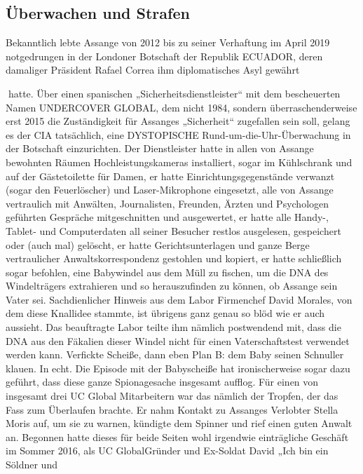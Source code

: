 \begin{multicols}{2}

\chapter{Überwachen und Strafen} 
Bekanntlich lebte Assange von 2012 bis zu seiner Verhaftung im April 2019 notgedrungen in der Londoner
Botschaft der Republik ECUADOR, deren damaliger Präsident Rafael Correa ihm diplomatisches Asyl gewährt

hatte. Über einen spanischen „Sicherheitsdienstleister“
mit dem bescheuerten Namen UNDERCOVER GLOBAL,
dem nicht 1984, sondern überraschenderweise erst 2015
die Zuständigkeit für Assanges „Sicherheit“ zugefallen
sein soll, gelang es der CIA tatsächlich, eine DYSTOPISCHE Rund-um-die-Uhr-Überwachung in der Botschaft
einzurichten. Der Dienstleister hatte in allen von Assange bewohnten Räumen Hochleistungskameras installiert, sogar im Kühlschrank und auf der Gästetoilette
für Damen, er hatte Einrichtungsgegenstände verwanzt
(sogar den Feuerlöscher) und Laser-Mikrophone eingesetzt, alle von Assange vertraulich mit Anwälten, Journalisten, Freunden, Ärzten und Psychologen geführten
Gespräche mitgeschnitten und ausgewertet, er hatte
alle Handy-, Tablet- und Computerdaten all seiner Besucher restlos ausgelesen, gespeichert oder (auch mal)
gelöscht, er hatte Gerichtsunterlagen und ganze Berge
vertraulicher Anwaltskorrespondenz gestohlen und kopiert, er hatte schließlich sogar befohlen, eine Babywindel aus dem Müll zu fischen, um die DNA des Windelträgers extrahieren und so herauszufinden zu können, ob
Assange sein Vater sei.
Sachdienlicher Hinweis aus dem Labor
Firmenchef David Morales, von dem diese Knallidee
stammte, ist übrigens ganz genau so blöd wie er auch aussieht. Das beauftragte Labor teilte ihm nämlich postwendend mit, dass die DNA aus den Fäkalien dieser Windel
nicht für einen Vaterschaftstest verwendet werden kann.
Verfickte Scheiße, dann eben Plan B: dem Baby seinen
Schnuller klauen. In echt. Die Episode mit der Babyscheiße hat ironischerweise sogar dazu geführt, dass diese ganze Spionagesache insgesamt aufflog. Für einen von insgesamt drei UC Global Mitarbeitern war das nämlich der
Tropfen, der das Fass zum Überlaufen brachte. Er nahm
Kontakt zu Assanges Verlobter Stella Moris auf, um sie zu
warnen, kündigte dem Spinner und rief einen guten Anwalt an.
Begonnen hatte dieses für beide Seiten wohl irgendwie
einträgliche Geschäft im Sommer 2016, als UC GlobalGründer und Ex-Soldat David „Ich bin ein Söldner und

\end{multicols}
